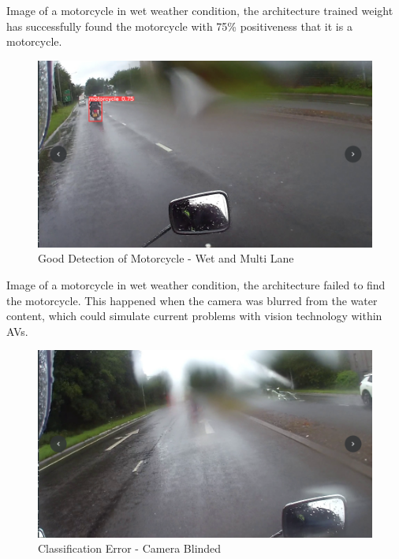 \documentclass[conference]{IEEEtran}
\begin{document}
	Image of a motorcycle in wet weather condition, the architecture trained weight has successfully found the motorcycle with 75\% positiveness that it is a motorcycle. 
	\begin{figure}[htp]
        \centering
        \includegraphics[width=\columnwidth]{Figures/wet_correct.png}
        \caption{Good Detection of Motorcycle - Wet and Multi Lane}
        \label{fig:detectionOfMotorcycleW1}
    \end{figure}

	Image of a motorcycle in wet weather condition, the architecture failed to find the motorcycle. This happened when the camera was blurred from the water content, which could simulate current problems with vision technology within AVs.
	\begin{figure}[htp]
        \centering
        \includegraphics[width=\columnwidth]{Figures/wet_incorrect.png}
        \caption{Classification Error - Camera Blinded}
        \label{fig:detectionOfMotorcycleW2}
    \end{figure}
\end{document}
